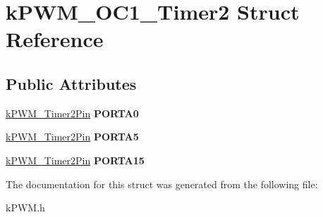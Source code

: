 \hypertarget{structkPWM__OC1__Timer2}{}\section{k\+P\+W\+M\+\_\+\+O\+C1\+\_\+\+Timer2 Struct Reference}
\label{structkPWM__OC1__Timer2}
\subsection*{Public Attributes}
\begin{DoxyCompactItemize}
\item 
\hyperlink{structkPWM__Timer2Pin}{k\+P\+W\+M\+\_\+\+Timer2\+Pin} {\bfseries P\+O\+R\+T\+A0}\hypertarget{structkPWM__OC1__Timer2_ab9ca88874e740b3e7ad5927b4bdc1544}{}\label{structkPWM__OC1__Timer2_ab9ca88874e740b3e7ad5927b4bdc1544}

\item 
\hyperlink{structkPWM__Timer2Pin}{k\+P\+W\+M\+\_\+\+Timer2\+Pin} {\bfseries P\+O\+R\+T\+A5}\hypertarget{structkPWM__OC1__Timer2_af5acd97823949654a98a90c4f1cd4928}{}\label{structkPWM__OC1__Timer2_af5acd97823949654a98a90c4f1cd4928}

\item 
\hyperlink{structkPWM__Timer2Pin}{k\+P\+W\+M\+\_\+\+Timer2\+Pin} {\bfseries P\+O\+R\+T\+A15}\hypertarget{structkPWM__OC1__Timer2_af025e443bca95684b3f01538470b44e4}{}\label{structkPWM__OC1__Timer2_af025e443bca95684b3f01538470b44e4}

\end{DoxyCompactItemize}


The documentation for this struct was generated from the following file\+:\begin{DoxyCompactItemize}
\item 
k\+P\+W\+M.\+h\end{DoxyCompactItemize}
